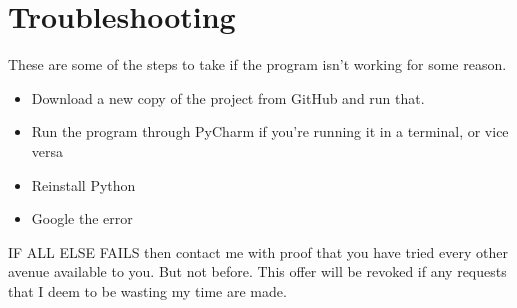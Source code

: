 \documentclass{article}
\begin{document}
\section{Troubleshooting}
These are some of the steps to take if the program isn't working for some reason.
\begin{itemize}
	\item Download a new copy of the project from GitHub and run that.
	\item Run the program through PyCharm if you're running it in a terminal, or vice versa
	\item Reinstall Python
	\item Google the error
\end{itemize}
\huge\uppercase{If all else fails} \normalsize then contact me with proof that you
have tried every other avenue available to you. But not before. This offer will be revoked if any
requests that I deem to be wasting my time are made.
\end{document}
